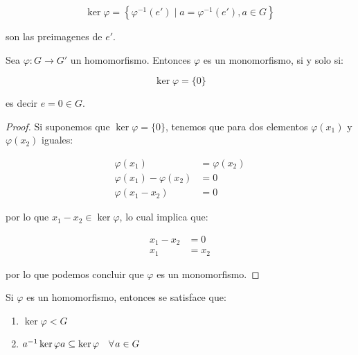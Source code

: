         \begin{observacion}
            \begin{equation}
                \ker{\varphi} = \left\{ \varphi^{-1}(e') \mid a = \varphi^{-1}(e'), a \in G \right\}
            \end{equation}

            son las preimagenes de $e'$.
        \end{observacion}

        \begin{proposicion}
            Sea $\varphi \colon G \to G'$ un homomorfismo. Entonces $\varphi$ es un monomorfismo, si y solo si:

            \begin{equation}
                \ker{\varphi} = \{0\}
            \end{equation}

            es decir $e = 0 \in G$.
        \end{proposicion}

        \begin{proof}
            Si suponemos que $\ker{\varphi} = \{0\}$, tenemos que para dos elementos $\varphi(x_1)$ y $\varphi(x_2)$ iguales:

            \begin{align*}
                \varphi(x_1) &= \varphi(x_2) \\
                \varphi(x_1) - \varphi(x_2) &= 0 \\
                \varphi(x_1 - x_2) &= 0
            \end{align*}

            por lo que $x_1 - x_2 \in \ker{\varphi}$, lo cual implica que:

            \begin{align*}
                x_1 - x_2 &= 0 \\
                x_1 &= x_2
            \end{align*}

            por lo que podemos concluir que $\varphi$ es un monomorfismo.
        \end{proof}

        \begin{teorema}
            Si $\varphi$ es un homomorfismo, entonces se satisface que:

            \begin{enumerate}
                \item $\ker{\varphi} < G$
                \item $a^{-1} \ker{\varphi} a \subseteq \ker{\varphi} \quad \forall \mkern2mu a \in G$
            \end{enumerate}
        \end{teorema}


